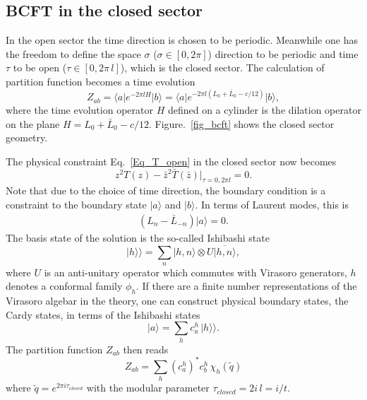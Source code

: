 \documentclass[submission, PhysLectNotes]{SciPost}
\begin{document}
\subsection{BCFT in the closed sector}
In the open sector the time direction is chosen to be periodic. Meanwhile one has the freedom to define the space $\sigma$ ($\sigma \in [0,2\pi]$) direction to be periodic and time $\tau$ to be open ($\tau \in [0,2\pi\,l]$), which is the closed sector. The calculation of partition function becomes a time evolution
\begin{equation}
    Z_{ab} = \langle a \vert e^{-2\pi l H} \vert b \rangle = \langle a \vert e^{-2\pi l (L_0 + \bar{L}_0 -c/12)} \vert b \rangle,
\end{equation}
where the time evolution operator $H$ defined on a cylinder is the dilation operator on the plane $H = L_0 + \bar{L}_0 - c/12$. Figure.~\ref{fig_bcft} shows the closed sector geometry.

The physical constraint Eq.~\ref{Eq_T_open} in the closed sector now becomes 
\begin{equation}
    z^2 T(z) - \bar{z}^2 \bar{T}(\bar{z})\vert_{\tau=0,2\pi l} = 0.
\end{equation}
Note that due to the choice of time direction, the boundary condition is a constraint to the boundary state $\vert a \rangle$ and $\vert b\rangle$. In terms of Laurent modes, this is
\begin{equation}
    \begin{split}
        \left(L_n - \bar{L}_{-n}\right) \vert a \rangle = 0.  
    \end{split}
\end{equation}
The basis state of the solution is the so-called Ishibashi state
\begin{equation}
    \vert h \rangle\rangle = \sum_n \vert h,n\rangle \otimes U\overline{\vert h,n\rangle},
\end{equation}
where $U$ is an anti-unitary operator which commutes with Virasoro generators, $h$ denotes a conformal family $\phi_h$. If there are a finite number representations of the Virasoro algebar in the theory, one can construct physical boundary states, the Cardy states, in terms of the Ishibashi states
\begin{equation}
    \vert a \rangle = \sum_h c_a^h\, \vert h \rangle \rangle. 
\end{equation}
The partition function $Z_{ab}$ then reads
\begin{equation}
    Z_{ab} = \sum_h \left(c_a^h\right)^* c_b^h\, \chi_h(\tilde{q})
\end{equation}
where $\tilde{q} = e^{2\pi i \tau_{closed}}$ with the modular parameter $\tau_{closed} = 2i\,l = i/t$.
\end{document}
